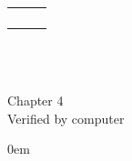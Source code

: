 \documentclass{report}
\begin{document}
\begin{flushleft}
\begin{minipage}{\linewidth}
\begin{minipage}{0.45\textwidth}
\begin{tabular}{|p{\textwidth}}
\begin{enumerate}
		
\end{enumerate}
\end{tabular}
\end{minipage}\\
\blank[width=\linewidth]{}~\\
\end{minipage}

\begin{minipage}{\linewidth}
\begin{center}
Chapter 4\\
Verified by computer\\
\end{center}



\begin{enumerate}
  \itemsep0em
	

\end{enumerate}
\end{minipage}
\end{flushleft}
\end{document}
